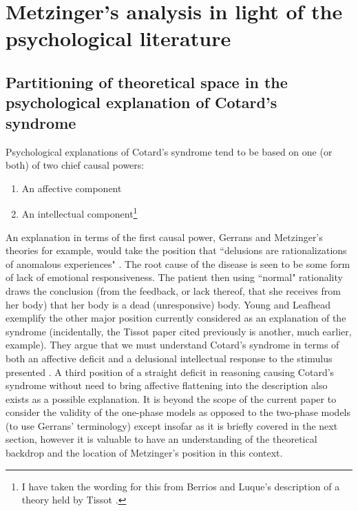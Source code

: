 \chapter{Metzinger's analysis in light of the psychological literature}
\label{chap:psych_lit}

\section{Partitioning of theoretical space in the psychological explanation of Cotard's syndrome}
\label{psych_partitioning}

Psychological explanations of Cotard's syndrome tend to be based on one (or both) of two chief causal powers:
\begin{enumerate}
\item An affective component
\item An intellectual component\footnote{I have taken the wording for this from Berrios and Luque's \cite{berrios1995b} description of a theory held by Tissot \cite{tissot1921delire}.}
\end{enumerate}

An explanation in terms of the first causal power, Gerrans \cite{gerrans2003} and Metzinger's \cite{metzinger2003} theories for example, would take the position that ``delusions are rationalizations of anomalous experiences" \cite[p. 47]{gerrans2003}. The root cause of the disease is seen to be some form of lack of emotional responsiveness. The patient then using ``normal" rationality draws the conclusion (from the feedback, or lack thereof, that she receives from her body) that her body is a dead (unresponsive) body. Young and Leafhead exemplify the other major position currently considered as an explanation of the syndrome (incidentally, the Tissot paper cited previously is another, much earlier, example). They argue that we must understand Cotard's syndrome in terms of both an affective deficit and a delusional intellectual response to the stimulus presented \cite[pp. 164-165]{young1995}. A third position of a straight deficit in reasoning causing Cotard's syndrome without need to bring affective flattening into the description also exists as a possible explanation. It is beyond the scope of the current paper to consider the validity of the one-phase models as opposed to the two-phase models (to use Gerrans' terminology) except insofar as it is briefly covered in the next section, however it is valuable to have an understanding of the theoretical backdrop and the location of Metzinger's position in this context.

